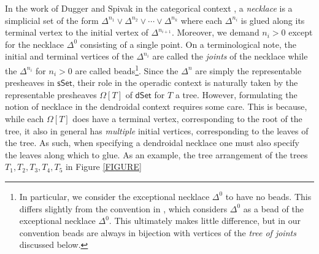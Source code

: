 \documentclass[a4paper,10pt
,draft
]{article}%
\numberwithin{equation}{section}
\numberwithin{figure}{section}
\theoremstyle{definition} %
\newcommand{\1}{\ensuremath{\mathbbm 1}}%
\begin{document}
In the work of Dugger and Spivak in the categorical context
\cite{DS11},
a \emph{necklace} is a simplicial set of the form
$\Delta^{n_1} \vee 
\Delta^{n_2} \vee \cdots \vee
\Delta^{n_k}$
where each $\Delta^{n_i}$ is glued along its terminal vertex to the initial vertex of $\Delta^{n_{i+1}}$.
Moreover, we demand $n_i > 0$
except for the necklace $\Delta^0$ consisting of a single point.
On a terminological note, the initial and terminal vertices of the 
$\Delta^{n_i}$ are called the \emph{joints} of the necklace
while the $\Delta^{n_i}$ for $n_i>0$ are called beads\footnote{In particular, 
we consider the exceptional necklace $\Delta^0$ to
have no beads.  
This differs slightly from the convention in \cite{DS11}, which considers $\Delta^0$ as a bead of the exceptional necklace $\Delta^0$. 
This ultimately makes little difference,
but in our convention beads are always in bijection with 
vertices of the \emph{tree of joints} discussed below.}.
Since the $\Delta^n$ are simply the representable presheaves in 
$\mathsf{sSet}$,
their role in the operadic context is naturally taken by the 
representable presheaves $\Omega[T]$ of $\mathsf{dSet}$
for $T$ a tree.
However, formulating the notion of necklace in the dendroidal context requires some care.
This is because, while each $\Omega[T]$ does have a terminal vertex, 
corresponding to the root of the tree, 
it also in general has 
\emph{multiple} initial vertices, corresponding to the leaves
of the tree.
As such, when specifying a dendroidal necklace
one must also specify the leaves along which to glue.
As an example, the tree arrangement of the trees
$T_1,T_2,T_3,T_4,T_5$
in Figure \ref{FIGURE}
\end{document}
